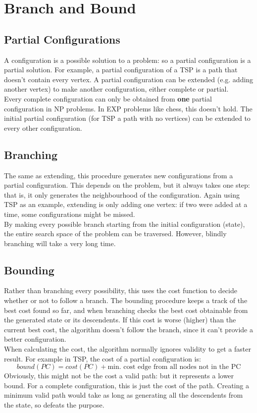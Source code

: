 \section{Branch and Bound}

\subsection{Partial Configurations}
A configuration is a possible solution to a problem: so a partial configuration is a partial solution. For example, a partial configuration of a TSP is a path that doesn't contain every vertex. A partial configuration can be extended (e.g. adding another vertex) to make another configuration, either complete or partial.\\
Every complete configuration can only be obtained from \textbf{one} partial configuration in NP problems. In EXP problems like chess, this doesn't hold. The initial partial configuration (for TSP a path with no vertices) can be extended to every other configuration. 

\subsection{Branching}
The same as extending, this procedure generates new configurations from a partial configuration. This depends on the problem, but it always takes one step: that is, it only generates the neighbourhood of the configuration. Again using TSP as an example, extending is only adding one vertex: if two were added at a time, some configurations might be missed. \\
By making every possible branch starting from the initial configuration (state), the entire search space of the problem can be traversed. However, blindly branching will take a very long time.

\subsection{Bounding}
Rather than branching every possibility, this uses the cost function to decide whether or not to follow a branch. The bounding procedure keeps a track of the best cost found so far, and when branching checks the best cost obtainable from the generated state or its descendents. If this cost is worse (higher) than the current best cost, the algorithm doesn't follow the branch, since it can't provide a better configuration. \\
When calculating the cost, the algorithm normally ignores validity to get a faster result. For example in TSP, the cost of a partial configuration is:
\begin{equation}
    bound(PC) = cost(PC) + \text{min. cost edge from all nodes not in the PC}
\end{equation}
Obviously, this might not be the cost a valid path: but it represents a lower bound. For a complete configuration, this is just the cost of the path. Creating a minimum valid path would take as long as generating all the descendents from the state, so defeats the purpose.

